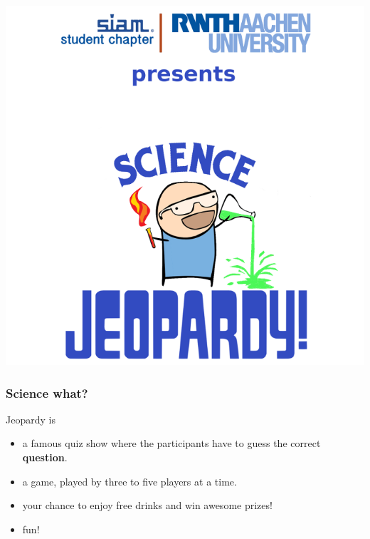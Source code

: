 \documentclass{beamer}
\begin{document}
	
	\begin{frame}
		\begin{center}
		{\includegraphics[scale = 0.3]{greeting.png}}
		\end{center}
	\end{frame}
	
	\begin{frame}
		\frametitle{Science what?}
		Jeopardy is
		\begin{itemize}
			\item a famous quiz show where the participants have to guess the correct \textbf{question}.
			\item a game, played by three to five players at a time.
			\item your chance to enjoy free drinks and win awesome prizes!
			\item fun!
		\end{itemize}
	\end{frame}
	
\end{document}
